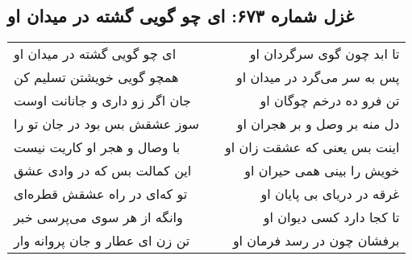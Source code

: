 \begin{center}
\section*{غزل شماره ۶۷۳: ای چو گویی گشته در میدان او}
\label{sec:673}
\begin{longtable}{l p{0.5cm} r}
ای چو گویی گشته در میدان او
&&
تا ابد چون گوی سرگردان او
\\
همچو گویی خویشتن تسلیم کن
&&
پس به سر می‌گرد در میدان او
\\
جان اگر زو داری و جانانت اوست
&&
تن فرو ده درخم چوگان او
\\
سوز عشقش بس بود در جان تو را
&&
دل منه بر وصل و بر هجران او
\\
با وصال و هجر او کاریت نیست
&&
اینت بس یعنی که عشقت زان او
\\
این کمالت بس که در وادی عشق
&&
خویش را بینی همی حیران او
\\
تو که‌ای در راه عشقش قطره‌ای
&&
غرقه در دریای بی پایان او
\\
وانگه از هر سوی می‌پرسی خبر
&&
تا کجا دارد کسی دیوان او
\\
تن زن ای عطار و جان پروانه وار
&&
برفشان چون در رسد فرمان او
\\
\end{longtable}
\end{center}
